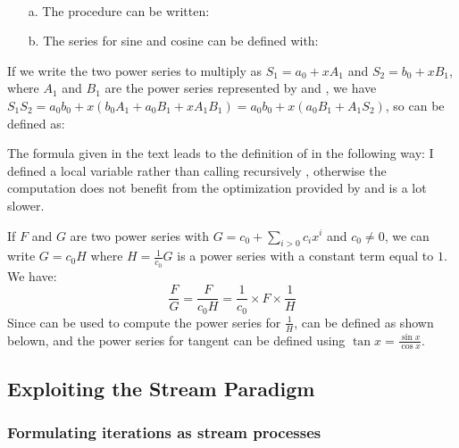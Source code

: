 \begin{exe}[3.59]
    \ \vspace{-20pt}
    \begin{itemize}
	\item[a.] The procedure  can be written:
	\item[b.] The series for sine and cosine can be defined with:
    \end{itemize}
\end{exe}

\begin{exe}[3.60]
    If we write the two power series to multiply as $S_1 = a_0 + x A_1$ and $S_2 
    = b_0 + x B_1$, where $A_1$ and $B_1$ are the power series represented by
     and , we have
    $S_1 S_2 = a_0 b_0 + x (b_0 A_1 + a_0 B_1 + x A_1 B_1)
    = a_0 b_0 + x (a_0 B_1 + A_1 S_2)$, so  can be defined as:
\end{exe}

\begin{exe}[3.61]
    The formula given in the text leads to the definition of 
     in the following way:
    I defined a local variable rather than calling recursively 
    , otherwise the computation does not benefit from 
    the optimization provided by  and is a lot slower.
\end{exe}

\begin{exe}[3.62]
    If $F$ and $G$ are two power series with $G = c_0 + \sum_{i > 0} c_i x^i$ 
    and $c_0 \neq 0$, we can write $G = c_0 H$ where $H = \frac{1}{c_0} G$ is 
    a power series with a constant term equal to $1$. We have:
    \[
    \frac{F}{G} = \frac{F}{c_0 H} = \frac{1}{c_0} \times F \times \frac{1}{H}
    \]
    Since  can be used to compute the power series for 
    $\frac{1}{H}$,  can be defined as shown belown, and the 
    power series for tangent can be defined using $\tan x = \frac{\sin x}{\cos 
    x}$.
\end{exe}

\subsection{Exploiting the Stream Paradigm}

\subsubsection{Formulating iterations as stream processes}

